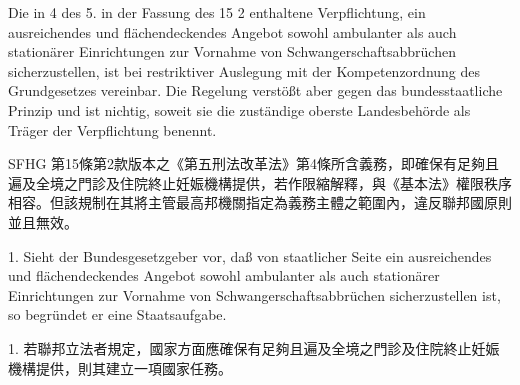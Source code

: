 \documentclass[12pt]{article}
\begin{document}

\begin{sourcepara}[title={原文E.235}]
Die in \abbrArt{} 4 des 5. \abbrStrRG{} in der Fassung des \abbrArt{} 15 \abbrNr{} 2 \abbrSFHG{} enthaltene Verpflichtung, ein ausreichendes und flächendeckendes Angebot sowohl ambulanter als auch stationärer Einrichtungen zur Vornahme von Schwangerschaftsabbrüchen sicherzustellen, ist bei restriktiver Auslegung mit der Kompetenzordnung des Grundgesetzes vereinbar. Die Regelung verstößt aber gegen das bundesstaatliche Prinzip und ist nichtig, soweit sie die zuständige oberste Landesbehörde als Träger der Verpflichtung benennt.
\end{sourcepara}
\begin{transpara}
SFHG 第15條第2款版本之《第五刑法改革法》第4條所含義務，即確保有足夠且遍及全境之門診及住院終止妊娠機構提供，若作限縮解釋，與《基本法》權限秩序相容。但該規制在其將主管最高邦機關指定為義務主體之範圍內，違反聯邦國原則並且無效。
\end{transpara}

\begin{sourcepara}[title={原文E.236}]
1. Sieht der Bundesgesetzgeber vor, daß von staatlicher Seite ein ausreichendes und flächendeckendes Angebot sowohl ambulanter als auch stationärer Einrichtungen zur Vornahme von Schwangerschaftsabbrüchen sicherzustellen ist, so begründet er eine Staatsaufgabe.
\end{sourcepara}
\begin{transpara}
1. 若聯邦立法者規定，國家方面應確保有足夠且遍及全境之門診及住院終止妊娠機構提供，則其建立一項國家任務。
\end{transpara}
\end{document}
